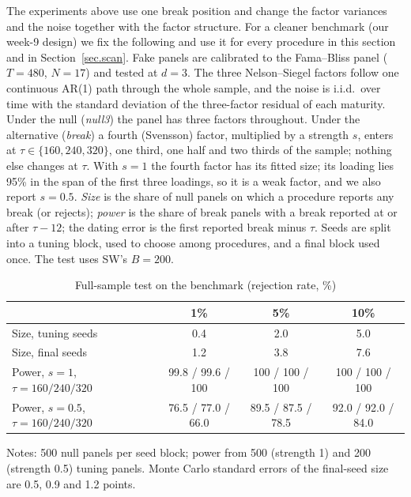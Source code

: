 \documentclass[11pt]{article}
\begin{document}
The experiments above use one break position and change the factor variances and the noise together with the factor structure. For a cleaner benchmark (our week-9 design) we fix the following and use it for every procedure in this section and in Section~\ref{sec.scan}. Fake panels are calibrated to the Fama--Bliss panel ($T=480$, $N=17$) and tested at $d=3$. The three Nelson--Siegel factors follow one continuous AR(1) path through the whole sample, and the noise is i.i.d.\ over time with the standard deviation of the three-factor residual of each maturity. Under the null (\emph{null3}) the panel has three factors throughout. Under the alternative (\emph{break}) a fourth (Svensson) factor, multiplied by a strength $s$, enters at $\tau\in\{160,240,320\}$, one third, one half and two thirds of the sample; nothing else changes at $\tau$. With $s=1$ the fourth factor has its fitted size; its loading lies 95\% in the span of the first three loadings, so it is a weak factor, and we also report $s=0.5$. \emph{Size} is the share of null panels on which a procedure reports any break (or rejects); \emph{power} is the share of break panels with a break reported at or after $\tau-12$; the dating error is the first reported break minus $\tau$. Seeds are split into a tuning block, used to choose among procedures, and a final block used once. The test uses SW's $B=200$.

\begin{table}[htbp]
\centering
\begin{threeparttable}
\caption{Full-sample test on the benchmark (rejection rate, \%)}\label{tab.bench}
\begin{tabular}{lccc}
\toprule
 & 1\% & 5\% & 10\%\\
\midrule
Size, tuning seeds & 0.4 & 2.0 & 5.0\\
Size, final seeds & 1.2 & 3.8 & 7.6\\
Power, $s=1$, $\tau=160/240/320$ & 99.8 / 99.6 / 100 & 100 / 100 / 100 & 100 / 100 / 100\\
Power, $s=0.5$, $\tau=160/240/320$ & 76.5 / 77.0 / 66.0 & 89.5 / 87.5 / 78.5 & 92.0 / 92.0 / 84.0\\
\bottomrule
\end{tabular}
\begin{tablenotes}\small
\item Notes: 500 null panels per seed block; power from 500 (strength 1) and 200 (strength 0.5) tuning panels. Monte Carlo standard errors of the final-seed size are 0.5, 0.9 and 1.2 points.
\end{tablenotes}
\end{threeparttable}
\end{table}
\end{document}
